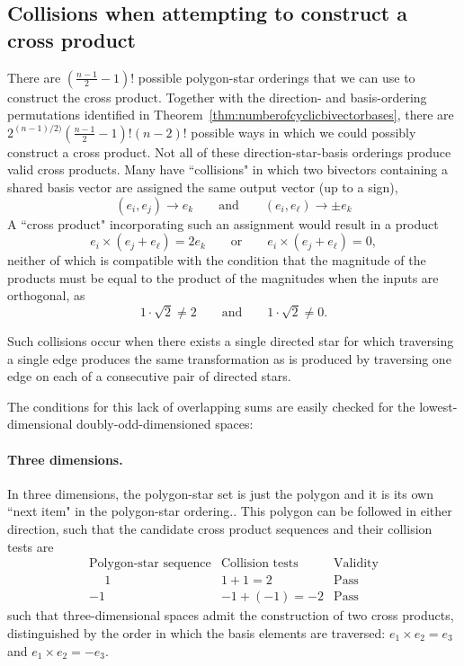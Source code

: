 \documentclass[11pt]{article}
\newcommand{\bv}[1][]{e_{#1}}
\newcommand{\bp}[2]{(#1,#2)}
\begin{document}
\subsection{Collisions when attempting to construct a cross product}
There are $ (\frac{n-1}{2} -1)! $ possible polygon-star orderings that we can use to construct the cross product. Together with the direction- and basis-ordering permutations identified in Theorem~\ref{thm:numberofcyclicbivectorbases}, there are $2^{(n-1)/2)} (\frac{n-1}{2} -1)!  (n-2)!$ possible ways in which we could possibly construct a cross product.
Not all of these  direction-star-basis orderings produce valid cross products. Many have ``collisions" in which two bivectors containing a shared basis vector are assigned the same output vector (up to a sign),
%
\begin{equation}
\bp{\bv[i]}{\bv[j]} \rightarrow \bv[k] \qquad \mathrm{and} \qquad \bp{\bv[i]}{\bv[\ell]} \rightarrow \pm\bv[k] 
\end{equation}
%
A ``cross product" incorporating such an assignment would result in a product
%
\begin{equation}
\bv[i] \times (\bv[j]+\bv[\ell]) = 2 \bv[k] \qquad \mathrm{or} \qquad \bv[i] \times (\bv[j]+\bv[\ell]) = 0,
\end{equation}
neither of which is compatible with the condition that the magnitude of the products must be equal to the product of the magnitudes when the inputs are orthogonal, as
\begin{equation} 
1 \cdot \sqrt{2} \neq 2 \qquad \mathrm{and} \qquad 1 \cdot \sqrt{2} \neq 0 .
\end{equation}


Such collisions occur when there exists a single directed star for which traversing a single edge produces the same transformation as is produced by traversing one edge on each of a consecutive pair of directed stars.

The conditions for this lack of overlapping sums are easily checked for the lowest-dimensional doubly-odd-dimensioned spaces:

\paragraph{Three dimensions.} In three dimensions, the polygon-star set is just the polygon and it is its own ``next item" in the polygon-star ordering.. This polygon can be followed in either direction, such that the candidate cross product sequences and their collision tests are
\begin{equation}
\begin{array}{c|c|c}
\text{Polygon-star sequence} & \text{Collision tests} & \text{Validity} \\\hline\hline
\phantom{-}1 & 1+1 = 2 & \text{Pass} \\
-1 & -1 + (-1) = -2 &  \text{Pass}
\end{array}
\end{equation}
%
such that three-dimensional spaces admit the construction of two cross products, distinguished by the order in which the basis elements are traversed: $\bv[1]\times\bv[2]=\bv[3]$ and $\bv[1]\times\bv[2]=-\bv[3]$.
\end{document}
